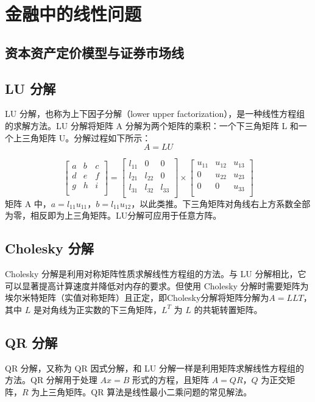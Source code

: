 \chapter{金融中的线性问题}
\section{资本资产定价模型与证券市场线}
\section{LU 分解}
LU 分解，也称为上下因子分解（lower upper factorization），是一种线性方程组的求解方法。LU 分解将矩阵 A 分解为两个矩阵的乘积：一个下三角矩阵 L 和一个上三角矩阵 U。分解过程如下所示：
$$A=LU$$

\begin{equation}
    \begin{bmatrix}
        a & b & c \\
        d & e & f \\
        g & h & i \\
    \end{bmatrix}=
    \begin{bmatrix}
        l_{11} & 0      & 0      \\
        l_{21} & l_{22} & 0      \\
        l_{31} & l_{32} & l_{33} \\
    \end{bmatrix}
    \times
    \begin{bmatrix}
        u_{11} & u_{12} & u_{13} \\
        0      & u_{22} & u_{23} \\
        0      & 0      & u_{33} \\
    \end{bmatrix}
\end{equation}
矩阵 A 中，$a = l_{11}u_{11}$，$b = l_{11}u_{12}$，以此类推。下三角矩阵对角线右上方系数全部为零，相反即为上三角矩阵。LU分解可应用于任意方阵。
\section{Cholesky 分解}
Cholesky 分解是利用对称矩阵性质求解线性方程组的方法。与 LU 分解相比，它可以显著提高计算速度并降低对内存的要求。但使用 Cholesky 分解时需要矩阵为埃尔米特矩阵（实值对称矩阵）且正定，即Cholesky分解将矩阵分解为$A = LLT$，其中 $L$ 是对角线为正实数的下三角矩阵，$L^T$ 为 $L$ 的共轭转置矩阵。
\section{QR 分解}
QR 分解，又称为 QR 因式分解，和 LU 分解一样是利用矩阵求解线性方程组的方法。QR 分解用于处理 $Ax = B$ 形式的方程，且矩阵 $A = QR$，$Q$ 为正交矩阵，$R$ 为上三角矩阵。QR 算法是线性最小二乘问题的常见解法。

